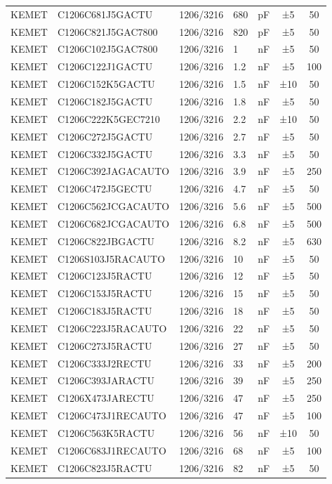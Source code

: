 \begin{tabular}{lllllcc}
KEMET & C1206C681J5GACTU   & 1206/3216 & 680 & pF & ±5  & 50  \\
KEMET & C1206C821J5GAC7800 & 1206/3216 & 820 & pF & ±5  & 50  \\
KEMET & C1206C102J5GAC7800 & 1206/3216 & 1   & nF & ±5  & 50  \\
KEMET & C1206C122J1GACTU   & 1206/3216 & 1.2 & nF & ±5  & 100 \\
KEMET & C1206C152K5GACTU   & 1206/3216 & 1.5 & nF & ±10 & 50  \\
KEMET & C1206C182J5GACTU   & 1206/3216 & 1.8 & nF & ±5  & 50  \\
KEMET & C1206C222K5GEC7210 & 1206/3216 & 2.2 & nF & ±10 & 50  \\
KEMET & C1206C272J5GACTU   & 1206/3216 & 2.7 & nF & ±5  & 50  \\
KEMET & C1206C332J5GACTU   & 1206/3216 & 3.3 & nF & ±5  & 50  \\
KEMET & C1206C392JAGACAUTO & 1206/3216 & 3.9 & nF & ±5  & 250 \\
KEMET & C1206C472J5GECTU   & 1206/3216 & 4.7 & nF & ±5  & 50  \\
KEMET & C1206C562JCGACAUTO & 1206/3216 & 5.6 & nF & ±5  & 500 \\
KEMET & C1206C682JCGACAUTO & 1206/3216 & 6.8 & nF & ±5  & 500 \\
KEMET & C1206C822JBGACTU   & 1206/3216 & 8.2 & nF & ±5  & 630 \\
KEMET & C1206S103J5RACAUTO & 1206/3216 & 10  & nF & ±5  & 50  \\
KEMET & C1206C123J5RACTU   & 1206/3216 & 12  & nF & ±5  & 50  \\
KEMET & C1206C153J5RACTU   & 1206/3216 & 15  & nF & ±5  & 50  \\
KEMET & C1206C183J5RACTU   & 1206/3216 & 18  & nF & ±5  & 50  \\
KEMET & C1206C223J5RACAUTO & 1206/3216 & 22  & nF & ±5  & 50  \\
KEMET & C1206C273J5RACTU   & 1206/3216 & 27  & nF & ±5  & 50  \\
KEMET & C1206C333J2RECTU   & 1206/3216 & 33  & nF & ±5  & 200 \\
KEMET & C1206C393JARACTU   & 1206/3216 & 39  & nF & ±5  & 250 \\
KEMET & C1206X473JARECTU   & 1206/3216 & 47  & nF & ±5  & 250 \\
KEMET & C1206C473J1RECAUTO & 1206/3216 & 47  & nF & ±5  & 100 \\
KEMET & C1206C563K5RACTU   & 1206/3216 & 56  & nF & ±10 & 50  \\
KEMET & C1206C683J1RECAUTO & 1206/3216 & 68  & nF & ±5  & 100 \\
KEMET & C1206C823J5RACTU   & 1206/3216 & 82  & nF & ±5  & 50 \\
\hline
\end{tabular}
